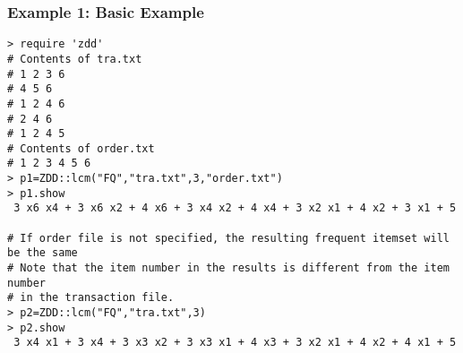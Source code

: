 \subsubsection*{Example 1: Basic Example}



\begin{Verbatim}[baselinestretch=0.7,frame=single]
> require 'zdd'
# Contents of tra.txt
# 1 2 3 6
# 4 5 6
# 1 2 4 6
# 2 4 6
# 1 2 4 5
# Contents of order.txt
# 1 2 3 4 5 6
> p1=ZDD::lcm("FQ","tra.txt",3,"order.txt")
> p1.show
 3 x6 x4 + 3 x6 x2 + 4 x6 + 3 x4 x2 + 4 x4 + 3 x2 x1 + 4 x2 + 3 x1 + 5

# If order file is not specified, the resulting frequent itemset will be the same
# Note that the item number in the results is different from the item number
# in the transaction file.
> p2=ZDD::lcm("FQ","tra.txt",3)
> p2.show
 3 x4 x1 + 3 x4 + 3 x3 x2 + 3 x3 x1 + 4 x3 + 3 x2 x1 + 4 x2 + 4 x1 + 5
\end{Verbatim}
